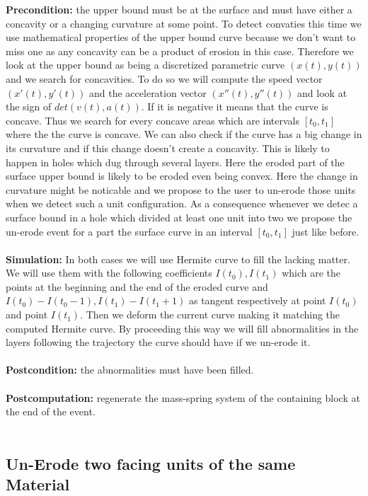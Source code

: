\documentclass[12pt, a4paper]{report} %
\begin{document}
\textbf{Precondition:} the upper bound must be at the surface and must have either a concavity or a changing curvature at some point. To detect convaties this time we use mathematical properties of the upper bound curve because we don't want to miss one as any concavity can be a product of erosion in this case. Therefore we look at the upper bound as being a discretized parametric curve $(x(t),y(t))$ and we search for concavities. To do so we will compute the speed vector $(x'(t),y'(t))$ and the acceleration vector $(x''(t),y''(t))$ and look at the sign of $det(v(t),a(t))$. If it is negative it means that the curve is concave. Thus we search for every concave areas which are intervals $[t_0,t_1]$ where the the curve is concave. We can also check if the curve has a big change in its curvature and if this change doesn't create a concavity. This is likely to happen  in holes which dug through several layers. Here the eroded part of the surface upper bound is likely to be eroded even being convex. Here the change in curvature might be noticable and we propose to the user to un-erode those units when we detect such a unit configuration. As a consequence whenever we detec a surface bound in a hole which divided at least one unit into two we propose the un-erode event for a part the surface curve in an interval $[t_0,t_1]$ just like before.\\\\
\textbf{Simulation:} In both cases we will use Hermite curve to fill the lacking matter. We will use them with the following coefficients $I(t_0), I(t_1)$ which are the points at the beginning and the end of the eroded curve and $I(t_0) - I(t_0 - 1), I(t_1) - I(t_1 + 1)$  as tangent respectively at point $I(t_0)$ and point $I(t_1)$. Then we deform the current curve making it matching the computed Hermite curve. By proceeding this way we will fill abnormalities in the layers following the trajectory the curve should have if we un-erode it.\\\\
\textbf{Postcondition:} the abnormalities must have been filled.\\\\
\textbf{Postcomputation:} regenerate the mass-spring system of the containing block at the end of the event.\\\\

\subsection{Un-Erode two facing units of the same Material}
\end{document}
